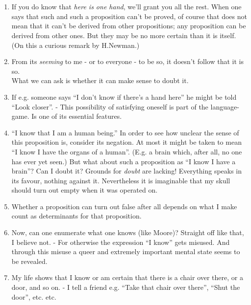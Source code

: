\documentclass{book}
\begin{document}
\mainmatter

\chapter{}

\begin{enumerate}

\item
If you do know that \emph{here is one hand}, we'll grant you all the rest.
When one says that such and such a proposition can't be proved, of course that
does not mean that it can't be derived from other propositions; any proposition
can be derived from other ones. But they may be no more certain than it is
itself. (On this a curious remark by H.Newman.)

\item
From its \emph{seeming} to me - or to everyone - to be so, it doesn't follow
that it is so. \\
What we can ask is whether it can make sense to doubt it.

\item
If e.g. someone says ``I don't know if there's a hand here'' he might be told
``Look closer''. - This possibility of satisfying oneself is part of the
language-game. Is one of its essential features.

\item
``I know that I am a human being.'' In order to see how unclear the sense of
this proposition is, consider its negation. At most it might be taken to mean
``I know I have the organs of a human''. (E.g. a brain which, after all, no one
has ever yet seen.) But what about such a proposition as ``I know I have a
brain''? Can I doubt it? Grounds for \emph{doubt} are lacking! Everything
speaks in its favour, nothing against it. Nevertheless it is imaginable that my
skull should turn out empty when it was operated on.

\item
Whether a proposition can turn out false after all depends on what I make count
as determinants for that proposition.

\item
Now, can one enumerate what one knows (like Moore)? Straight off like that, I
believe not. - For otherwise the expression ``I know'' gets misused. And
through this misuse a queer and extremely important mental state seems to be
revealed.

\item
My life shows that I know or am certain that there is a chair over there, or a
door, and so on. - I tell a friend e.g. ``Take that chair over there'', ``Shut
the door'', etc. etc.


\end{enumerate}
\end{document}
